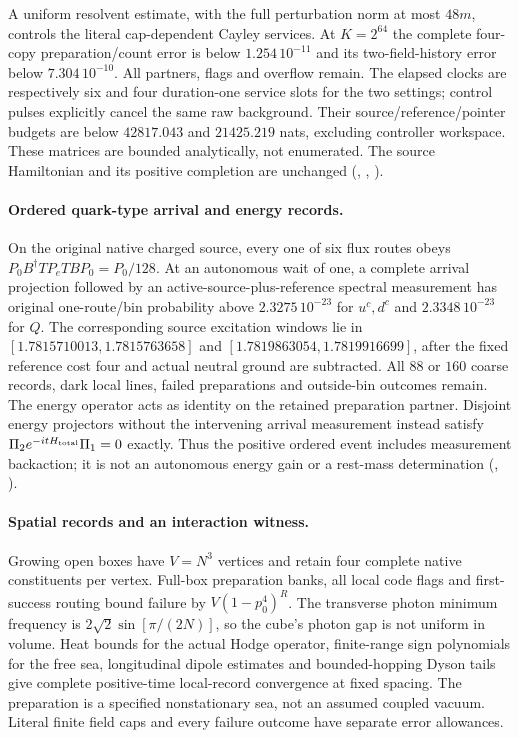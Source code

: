 A uniform resolvent estimate, with the full perturbation norm at most
$48m$, controls the literal cap-dependent Cayley services. At $K=2^{64}$
the complete four-copy preparation/count error is below $1.254\,10^{-11}$
and its two-field-history error below $7.304\,10^{-10}$. All partners,
flags and overflow remain. The elapsed clocks are respectively six and
four duration-one service slots for the two settings; control pulses
explicitly cancel the same raw background. Their source/reference/pointer
budgets are below $42817.043$ and $21425.219$ nats, excluding controller
workspace. These matrices are bounded analytically, not enumerated.
The source Hamiltonian and its positive completion are unchanged
(,
, \cite{ophrepo}).

\paragraph{Ordered quark-type arrival and energy records.}
On the original native charged source, every one of six flux routes obeys
$P_0B^\dagger T P_eTBP_0=P_0/128$. At an autonomous wait of one, a complete
arrival projection followed by an active-source-plus-reference spectral
measurement has original one-route/bin probability above $2.3275\,10^{-23}$
for $u^c,d^c$ and $2.3348\,10^{-23}$ for $Q$. The corresponding source
excitation windows lie in $[1.7815710013,1.7815763658]$ and
$[1.7819863054,1.7819916699]$, after the fixed reference cost four and
actual neutral ground are subtracted. All $88$ or $160$ coarse records,
dark local lines, failed preparations and outside-bin outcomes remain.
The energy operator acts as identity on the retained preparation partner.
Disjoint energy projectors without the intervening arrival measurement
instead satisfy $\Pi_2e^{-itH_{\rm total}}\Pi_1=0$ exactly. Thus the
positive ordered event includes measurement backaction; it is not an
autonomous energy gain or a rest-mass determination
(, \cite{ophrepo}).

\paragraph{Spatial records and an interaction witness.}
Growing open boxes have $V=N^3$ vertices and retain four complete native
constituents per vertex. Full-box preparation banks, all local code flags
and first-success routing bound failure by $V(1-p_0^4)^R$.
The transverse photon minimum frequency is
$2\sqrt2\sin[\pi/(2N)]$, so the cube's photon gap is not uniform in volume.
Heat bounds for the actual Hodge operator, finite-range sign polynomials
for the free sea, longitudinal dipole estimates and bounded-hopping Dyson
tails give complete positive-time local-record convergence at fixed
spacing. The preparation is a specified nonstationary sea, not an assumed
coupled vacuum. Literal finite field caps and every failure outcome have
separate error allowances.

